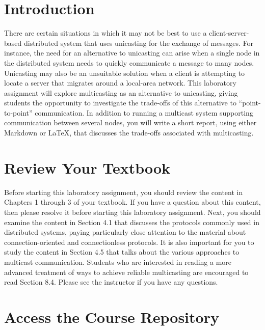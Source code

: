 

\usepackage[compact]{titlesec}



\section*{Introduction}

There are certain situations in which it may not be best to use a client-server-based distributed system that uses
unicasting for the exchange of messages. For instance, the need for an alternative to unicasting can arise when a single
node in the distributed system needs to quickly communicate a message to many nodes. Unicasting may also be an
unsuitable solution when a client is attempting to locate a server that migrates around a local-area network. This
laboratory assignment will explore multicasting as an alternative to unicasting, giving students the opportunity to
investigate the trade-offs of this alternative to ``point-to-point'' communication.  In addition to running a multicast
system supporting communication between several nodes, you will write a short report, using either Markdown or \LaTeX,
that discusses the trade-offs associated with multicasting.

\section*{Review Your Textbook}

Before starting this laboratory assignment, you should review the content in Chapters 1 through 3 of your textbook. If
you have a question about this content, then please resolve it before starting this laboratory assignment. Next, you
should examine the content in Section 4.1 that discusses the protocols commonly used in distributed systems, paying
particularly close attention to the material about connection-oriented and connectionless protocols. It is also
important for you to study the content in Section 4.5 that talks about the various approaches to multicast
communication. Students who are interested in reading a more advanced treatment of ways to achieve reliable multicasting
are encouraged to read Section 8.4. Please see the instructor if you have any questions.

\section*{Access the Course Repository}

